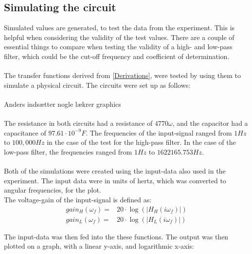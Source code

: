 \subsection{Simulating the circuit}
Simulated values are generated, to test the data from the experiment. This is helpful when considering the validity of the test values. There are a couple of essential things to compare when testing the validity of a high- and low-pass filter, which could be the cut-off frequency and coefficient of determination. 
\\ \\
The transfer functions derived from \cref{Derivations}, were tested by using them to simulate a physical circuit. The circuits were set up as follows:
\\
\\
Anders indsætter nogle lækrer graphics
\\
\\
The resistance in both circuits had a resistance of $4770 \omega$, and the capacitor had a capacitance of $97.61\cdot 10^{-9} F$. The frequencies of the input-signal ranged from $1 Hz$ to $100,000 Hz$ in the case of the test for the high-pass filter. In the case of the low-pass filter, the frequencies ranged from $1 Hz$ to $1622165.753 Hz$.
\\
\\
Both of the simulations were created using the input-data also used in the experiment. The input data were in units of hertz, which was converted to angular frequencies, for the plot.
\\
The voltage-gain of the input-signal is defined as:
\begin{align*}
	gain_H(\omega _f) =&20 \cdot \log{\left( \left|H_{H}(i \omega_f)\right| \right)}
	\\
	gain_L(\omega _f) =&20 \cdot \log{\left( \left|H_{L}(i \omega_f)\right| \right)}
\end{align*}

The input-data was then fed into the these functions. The output was then plotted on a graph, with a linear y-axis, and logarithmic x-axis:


